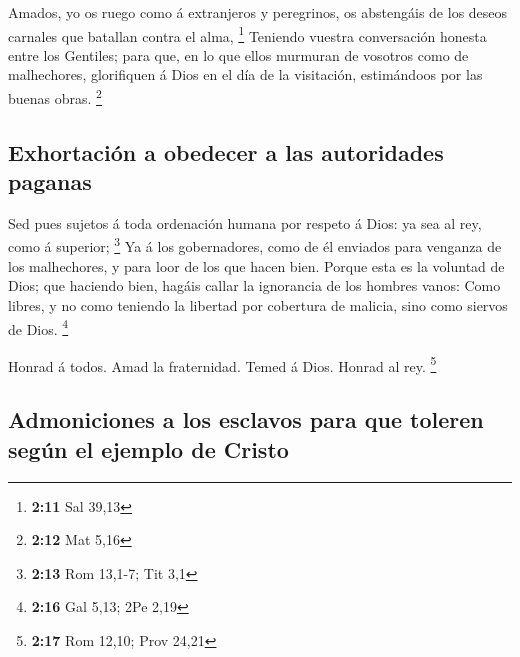  Amados, yo os ruego como á extranjeros y peregrinos, os
abstengáis de los deseos carnales que batallan contra el alma,
\footnote{\textbf{2:11} Sal 39,13}  Teniendo vuestra
conversación honesta entre los Gentiles; para que, en lo que ellos
murmuran de vosotros como de malhechores, glorifiquen á Dios en el día
de la visitación, estimándoos por las buenas obras. \footnote{\textbf{2:12}
  Mat 5,16}

\hypertarget{exhortaciuxf3n-a-obedecer-a-las-autoridades-paganas}{%
\subsection{Exhortación a obedecer a las autoridades
paganas}\label{exhortaciuxf3n-a-obedecer-a-las-autoridades-paganas}}

 Sed pues sujetos á toda ordenación humana por respeto á
Dios: ya sea al rey, como á superior; \footnote{\textbf{2:13} Rom
  13,1-7; Tit 3,1}  Ya á los gobernadores, como de él
enviados para venganza de los malhechores, y para loor de los que hacen
bien.  Porque esta es la voluntad de Dios; que haciendo
bien, hagáis callar la ignorancia de los hombres vanos: 
Como libres, y no como teniendo la libertad por cobertura de malicia,
sino como siervos de Dios. \footnote{\textbf{2:16} Gal 5,13; 2Pe 2,19}

 Honrad á todos. Amad la fraternidad. Temed á Dios. Honrad
al rey. \footnote{\textbf{2:17} Rom 12,10; Prov 24,21}

\hypertarget{admoniciones-a-los-esclavos-para-que-toleren-seguxfan-el-ejemplo-de-cristo}{%
\subsection{Admoniciones a los esclavos para que toleren según el
ejemplo de
Cristo}\label{admoniciones-a-los-esclavos-para-que-toleren-seguxfan-el-ejemplo-de-cristo}}

